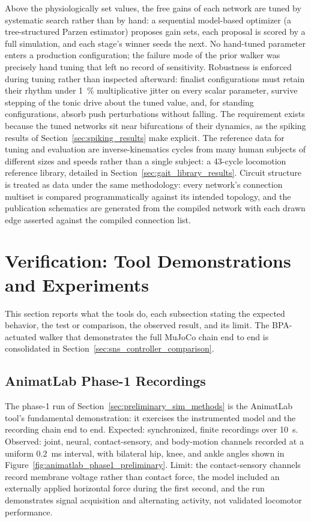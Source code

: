 Above the physiologically set values, the free gains of each network are tuned by systematic search rather than by hand: a sequential model-based optimizer (a tree-structured Parzen estimator) proposes gain sets, each proposal is scored by a full simulation, and each stage's winner seeds the next. No hand-tuned parameter enters a production configuration; the failure mode of the prior walker was precisely hand tuning that left no record of sensitivity. Robustness is enforced during tuning rather than inspected afterward: finalist configurations must retain their rhythm under \qty{1}{\percent} multiplicative jitter on every scalar parameter, survive stepping of the tonic drive about the tuned value, and, for standing configurations, absorb push perturbations without falling. The requirement exists because the tuned networks sit near bifurcations of their dynamics, as the spiking results of Section~\ref{sec:spiking_results} make explicit. The reference data for tuning and evaluation are inverse-kinematics cycles from many human subjects of different sizes and speeds rather than a single subject: a 43-cycle locomotion reference library, detailed in Section~\ref{sec:gait_library_results}. Circuit structure is treated as data under the same methodology: every network's connection multiset is compared programmatically against its intended topology, and the publication schematics are generated from the compiled network with each drawn edge asserted against the compiled connection list.

\section{Verification: Tool Demonstrations and Experiments}\label{sec:preliminary_sim_results}

This section reports what the tools do, each subsection stating the expected behavior, the test or comparison, the observed result, and its limit. The BPA-actuated walker that demonstrates the full MuJoCo chain end to end is consolidated in Section~\ref{sec:sns_controller_comparison}.

\subsection{AnimatLab Phase-1 Recordings}

The phase-1 run of Section~\ref{sec:preliminary_sim_methods} is the AnimatLab tool's fundamental demonstration: it exercises the instrumented model and the recording chain end to end. Expected: synchronized, finite recordings over \qty{10}{\second}. Observed: joint, neural, contact-sensory, and body-motion channels recorded at a uniform \qty{0.2}{\milli\second} interval, with bilateral hip, knee, and ankle angles shown in Figure~\ref{fig:animatlab_phase1_preliminary}. Limit: the contact-sensory channels record membrane voltage rather than contact force, the model included an externally applied horizontal force during the first second, and the run demonstrates signal acquisition and alternating activity, not validated locomotor performance.

